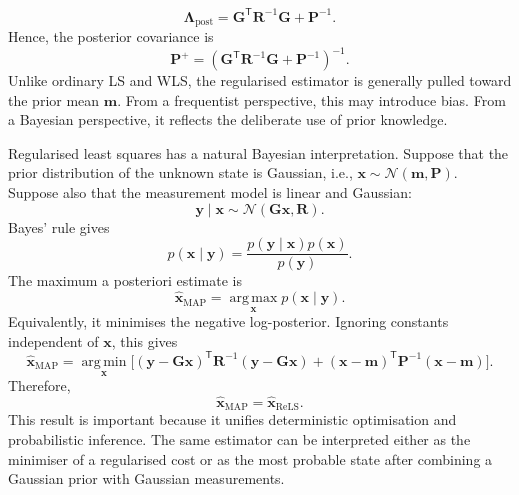 \documentclass[graybox,envcountchap]{style/SNmono}
\begin{document}
\begin{equation}
\mathbf{\Lambda}_{\mathrm{post}}
=
\mathbf{G}^{\mathsf T}
\mathbf{R}^{-1}
\mathbf{G}
+
\mathbf{P}^{-1}.
\end{equation}
Hence, the posterior covariance is
\begin{equation}
\mathbf{P}^{+}
=
\left(
\mathbf{G}^{\mathsf T}
\mathbf{R}^{-1}
\mathbf{G}
+
\mathbf{P}^{-1}
\right)^{-1}.
\end{equation}
Unlike ordinary LS and WLS, the regularised estimator is generally pulled toward the prior mean $\mathbf{m}$. From a frequentist perspective, this may introduce bias. From a Bayesian perspective, it reflects the deliberate use of prior knowledge.

Regularised least squares has a natural Bayesian interpretation. Suppose that the prior distribution of the unknown state is Gaussian, i.e., $\mathbf{x}
\sim
\mathcal{N}
\left(
\mathbf{m},
\mathbf{P}
\right)$. Suppose also that the measurement model is linear and Gaussian:
\begin{equation}
\mathbf{y}\mid\mathbf{x}
\sim
\mathcal{N}
\left(
\mathbf{G}\mathbf{x},
\mathbf{R}
\right).
\end{equation}
Bayes' rule gives
\begin{equation}
p(\mathbf{x}\mid\mathbf{y})
=
\frac{
p(\mathbf{y}\mid\mathbf{x})p(\mathbf{x})
}{
p(\mathbf{y})
}.
\end{equation}
The maximum a posteriori estimate is
\begin{equation}
\widehat{\mathbf{x}}_{\mathrm{MAP}}
=
\operatorname*{arg\,max}_{\mathbf{x}}
p(\mathbf{x}\mid\mathbf{y}).
\end{equation}
Equivalently, it minimises the negative log-posterior. Ignoring constants independent of $\mathbf{x}$, this gives
\begin{equation}
\widehat{\mathbf{x}}_{\mathrm{MAP}} = \operatorname*{arg\,min}_{\mathbf{x}} \bigg[ \left( \mathbf{y} - \mathbf{G}\mathbf{x} \right)^{\mathsf T} \mathbf{R}^{-1} \left( \mathbf{y} - \mathbf{G}\mathbf{x} \right) + \left( \mathbf{x} - \mathbf{m} \right)^{\mathsf T} \mathbf{P}^{-1} \left( \mathbf{x} - \mathbf{m} \right) \bigg].
\end{equation}
Therefore,
\begin{equation}
\widehat{\mathbf{x}}_{\mathrm{MAP}}
=
\widehat{\mathbf{x}}_{\mathrm{ReLS}}.
\end{equation}
This result is important because it unifies deterministic optimisation and probabilistic inference. The same estimator can be interpreted either as the minimiser of a regularised cost or as the most probable state after combining a Gaussian prior with Gaussian measurements.
\end{document}
